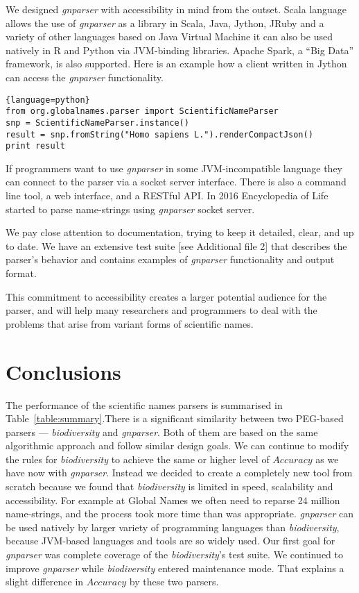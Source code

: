 \documentclass{bmcart}
\begin{document}
We designed \textit{gnparser} with accessibility in mind from the outset. Scala language allows the use of \textit{gnparser} as a library in Scala, Java, Jython, JRuby and a variety of other languages based on Java Virtual Machine it can also be used natively in R and Python via JVM-binding libraries. Apache Spark, a ``Big Data'' framework, is also supported.  Here is an example how a client written in Jython can access the \textit{gnparser} functionality.

\begin{lstlisting}{language=python}
from org.globalnames.parser import ScientificNameParser
snp = ScientificNameParser.instance()
result = snp.fromString("Homo sapiens L.").renderCompactJson()
print result
\end{lstlisting}


If programmers want to use \textit{gnparser} in some JVM-incompatible language they can connect to the parser via a socket server interface. There is also a command line tool, a web interface, and a RESTful API\@. In 2016 Encyclopedia of Life started to parse name-strings using \textit{gnparser} socket server.


We pay close attention to documentation, trying to keep it detailed, clear, and up to date. We have an extensive test suite [see Additional file 2] that describes the parser's behavior and contains examples of \textit{gnparser} functionality and output format.

This commitment to accessibility creates a larger potential audience for the parser, and will help many researchers and programmers to deal with the problems that arise from variant forms of scientific names.

\section*{Conclusions}

The performance of the scientific names parsers is summarised  in Table~\ref{table:summary}.There is a significant similarity between two PEG-based parsers --- \textit{biodiversity} and \textit{gnparser}. Both of them are based on the same algorithmic approach and follow similar design goals. We can continue to modify the rules for \textit{biodiversity} to achieve the same or higher level of $Accuracy$ as we have now with \textit{gnparser}. Instead we decided to create a completely new tool from scratch because we found that \textit{biodiversity} is limited in speed, scalability and accessibility. For example at Global Names we often need to reparse 24 million name-strings, and the process took more time than was appropriate.  \textit{gnparser} can be used natively by larger variety of programming languages than \textit{biodiversity}, because JVM-based languages and tools are so widely used. Our first goal for \textit{gnparser} was complete coverage of the \textit{biodiversity}'s test suite. We continued to improve \textit{gnparser} while \textit{biodiversity} entered maintenance mode. That explains a slight difference in $Accuracy$ by these two parsers.
\end{document}
